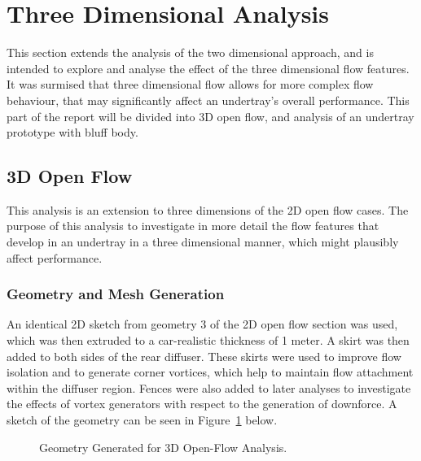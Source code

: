 \section{Three Dimensional Analysis}
\noindent This section extends the analysis of the two dimensional approach, and is intended to explore and analyse the effect of the three dimensional flow features. It was surmised that three dimensional flow allows for more complex flow behaviour, that may significantly affect an undertray's overall performance. This part of the report will be divided into 3D open flow, and analysis of an undertray prototype with bluff body.

\subsection{3D Open Flow}
This analysis is an extension to three dimensions of the 2D open flow cases. The purpose of this analysis to investigate in more detail the flow features that develop in an undertray in a three dimensional manner, which might plausibly affect performance.

\subsubsection{Geometry and Mesh Generation}
An identical 2D sketch from geometry 3 of the 2D open flow section was used, which was then extruded to a car-realistic thickness of 1 meter. A skirt was then added to both sides of the rear diffuser. These skirts were used to improve flow isolation and to generate corner vortices, which help to maintain flow attachment within the diffuser region. Fences were also added to later analyses to investigate the effects of vortex generators with respect to the generation of downforce. A sketch of the geometry can be seen in Figure~\ref{fig:3D_OF_GEOM} below. 

\begin{figure}[!h]
    \centering
    \noindent{}
    \caption{Geometry Generated for 3D Open-Flow Analysis.}
    \label{fig:3D_OF_GEOM}
\end{figure}

